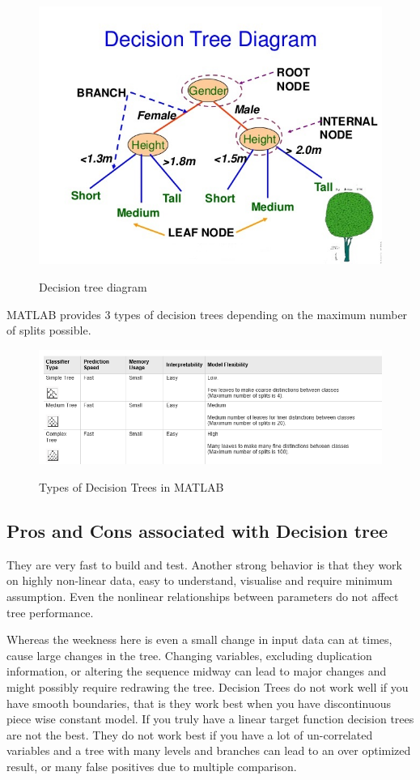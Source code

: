 \begin{figure}[H]
\centering
{\includegraphics[scale=0.48]{dt.jpg}}
\caption{Decision tree diagram}
\end{figure}

\noindent MATLAB provides 3 types of decision trees depending on the maximum number of splits possible.


\begin{figure}[H]
\centering
{\includegraphics[scale=0.87]{table.png}}
\caption{Types of Decision Trees in MATLAB}
\end{figure}

\newpage
\subsection{Pros and Cons associated with Decision tree} \label{Pros and Cons associated with Decision tree}

\noindent They are very fast to build and test. Another strong behavior is that they work on highly non-linear data, easy to understand, visualise and require minimum assumption. Even the nonlinear relationships between parameters do not affect tree performance.

\noindent Whereas the weekness here is even a small change in input data can at times, cause large changes in the tree. Changing variables, excluding duplication information, or altering the sequence midway can lead to major changes and might possibly require redrawing the tree. Decision Trees do not work well if you have smooth boundaries, that is they work best when you have discontinuous piece wise constant model. If you truly have a linear target function decision trees are not the best. They do not work best if you have a lot of un-correlated variables and a tree with many levels and branches can lead to an over optimized result, or many false positives due to multiple comparison.
